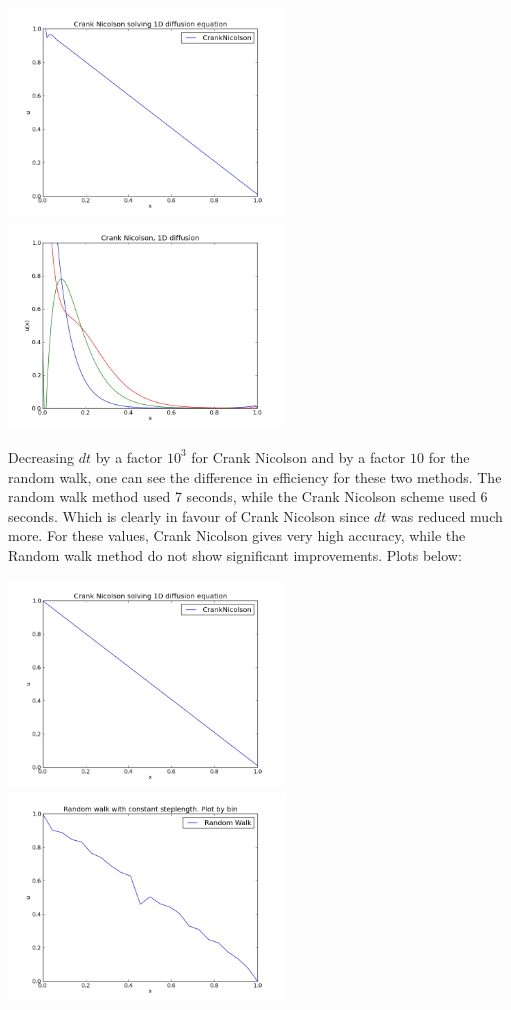 \documentclass[a4paper, 12pt, titlepage]{article}
\begin{document}
\begin{section}
\begin{subsection}
   \includegraphics[width=0.55\textwidth]{build-main-Desktop-Debug/CrankNicolson.png}{\centering}
   \includegraphics[width=0.55\textwidth]{build-main-Desktop-Debug/CrankNicolson_first3.png}{\centering}
   
   Decreasing $dt$ by a factor $10^3$ for Crank Nicolson and by a factor $10$ for the random walk, 
   one can see the difference in efficiency for these two methods. The random walk method used 7 seconds, 
   while the Crank Nicolson scheme used 6 seconds. Which is clearly in favour of Crank Nicolson since $dt$
   was reduced much more. For these values,
   Crank Nicolson gives very high accuracy, while the Random walk method do not show significant improvements.
   Plots below:
   
   \includegraphics[width=0.55\textwidth]{build-main-Desktop-Debug/CrankNicolson_low_dt.png}
   \includegraphics[width=0.55\textwidth]{build-main-Desktop-Debug/MC_uniform_low_dt.png}
   

\end{subsection}
\end{section}
\end{document}
